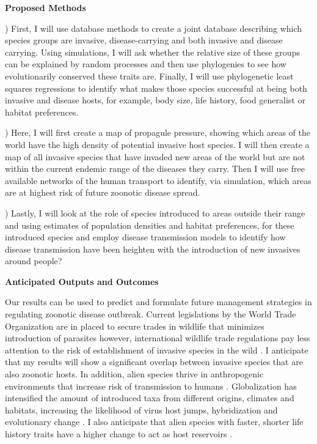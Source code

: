 \documentclass[11pt]{article}
\begin{document}
\noindent\textbf{Proposed Methods}

) First, I will use database methods to create a joint database describing which species groups
are invasive, disease-carrying and both invasive and disease carrying. Using simulations, I will 
ask whether the relative size of these groups can be explained by random processes and then use phylogenies 
to see how evolutionarily conserved these traits are. Finally, I will use phylogenetic least squares 
regressions to identify what makes those species successful at being both invasive and disease hosts, for 
example, body size, life history, food generalist or habitat preferences.

) Here, I will first create a map of propagule pressure, showing which areas of the world have the high density of potential 
invasive host species. I will then create a map of all invasive species that have invaded new areas of the world but are not
within the current endemic range of the diseases they carry. Then I will use free available networks of the human 
transport to identify, via simulation, which areas are at highest risk of future zoonotic disease spread. 

) Lastly, I will look at the role of species introduced to areas outside their range and using estimates of population 
densities and habitat preferences, for these introduced species and employ disease transmission models to identify how 
disease transmission have been heighten with the introduction of new invasives around people? 

\noindent\textbf{Anticipated Outputs and Outcomes}

Our results can be used to predict and formulate future management strategies in regulating zoonotic disease outbreak. Current legislations by 
the World Trade Organization are in placed to secure trades in wildlife that minimizes introduction of parasites 
however, international wildlife trade regulations pay less attention to the risk of establishment of invasive 
species in the wild \cite{hulme_invasive_2014}. I anticipate that my results will show a significant overlap between invasive 
species that are also zoonotic hosts. In addition, alien species thrive in anthropogenic environments that increase 
risk of transmission to humans \cite{hulme_invasive_2014}. Globalization has intensified the amount of introduced taxa from
different origins, climates and habitats, increasing the likelihood of virus host jumps, hybridization and evolutionary 
change \cite{hulme_invasive_2014}. I also anticipate that alien species with faster, shorter life history traits have a higher
change to act as host reservoirs \cite{keesing_impacts_2021}. 
\end{document}
